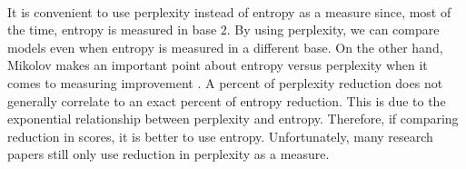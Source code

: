 \paragraph{}
It is convenient to use perplexity instead of entropy as a measure since, most of the time, entropy is measured in base $2$. By using perplexity, we can compare models even when entropy is measured in a different base. On the other hand, Mikolov makes an important point about entropy versus perplexity when it comes to measuring improvement \cite{Mikolov2012}. A percent of perplexity reduction does not generally correlate to an exact percent of entropy reduction. This is due to the exponential relationship between perplexity and entropy. Therefore, if comparing reduction in scores, it is better to use entropy. Unfortunately, many research papers still only use reduction in perplexity as a measure.
